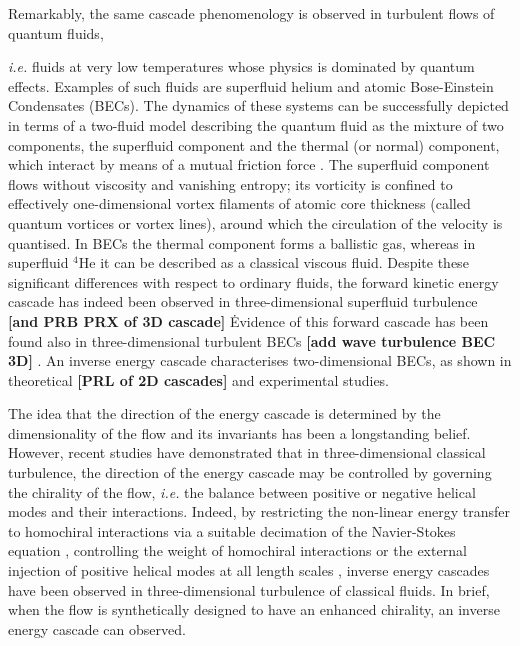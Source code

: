 \documentclass[%
 reprint,
 amsmath,amssymb,
 aps,
 prl,
]{revtex4-2}
\newcommand*{\NOTE}[1]{\textbf{\color{red}[#1]}}
\newcommand*{\CHANGE}[1]{{\color{brown}#1}}
\begin{document}
Remarkably, the same cascade phenomenology is observed in turbulent flows 
of quantum fluids, {\textit{i.e.} fluids at very low temperatures whose physics is
dominated by quantum effects.
Examples of such fluids are superfluid helium 
and atomic Bose-Einstein Condensates (BECs). 
The dynamics of these systems can be successfully depicted in terms of 
a two-fluid model \cite{tisza-1938,landau-1949,skrbek-sreenivasan-2012} 
describing the quantum fluid as the mixture of two components, 
the superfluid component and the thermal (or normal) component, which 
interact by means of a mutual friction force 
\cite{jackson-etal-2009,hall-vinen-1956a,hall-vinen-1956b}. 
The superfluid component flows without viscosity and
vanishing entropy; its vorticity is
confined to effectively one-dimensional vortex filaments
of atomic core thickness (called quantum vortices or vortex lines), 
around which the circulation of the velocity is quantised.
In BECs the thermal component forms a ballistic gas,
whereas in superfluid $^4$He it can be described as
a classical viscous fluid.
Despite these significant differences with respect to ordinary fluids, 
the forward kinetic energy cascade has
indeed been observed in three-dimensional superfluid
turbulence 
\cite{maurer1998,salort2010turbulent,baggaley2012,sherwin-robson2015} \NOTE{and PRB PRX of 3D cascade} \.
Evidence of this forward cascade has been found also in
three-dimensional turbulent BECs \cite{middleton-spencer2022}\NOTE{add wave turbulence BEC 3D} .
An inverse energy cascade characterises two-dimensional BECs, 
as shown in theoretical \cite{bradley2012energy,reeves2013,simula2014emergence} \NOTE{PRL of 2D cascades} and experimental \cite{johnstone2019evolution,gauthier2019giant} studies.

\CHANGE{The idea that the direction of the energy cascade is determined 
by the dimensionality of the flow and its invariants has been a 
longstanding belief. However, recent studies have demonstrated that 
in three-dimensional classical turbulence, the direction of the energy 
cascade may be controlled by governing the chirality of the 
flow, \textit{i.e.} the balance between 
positive or negative helical modes \cite{moffatt1969} and their interactions.
Indeed, by restricting the non-linear energy transfer to homochiral interactions via a suitable decimation of the Navier-Stokes equation 
\cite{biferaleInverseEnergyCascade2012a,biferale-etal-2013}, controlling the weight of homochiral interactions \cite{sahoo-etal-2017} or the external injection 
of positive helical modes at all length scales \cite{plunianInverseCascadeEnergy2020a}, inverse energy cascades have been observed in three-dimensional turbulence
of classical fluids. In brief, when the flow is synthetically designed to have an enhanced chirality, an inverse energy cascade can observed.}

}
\end{document}
